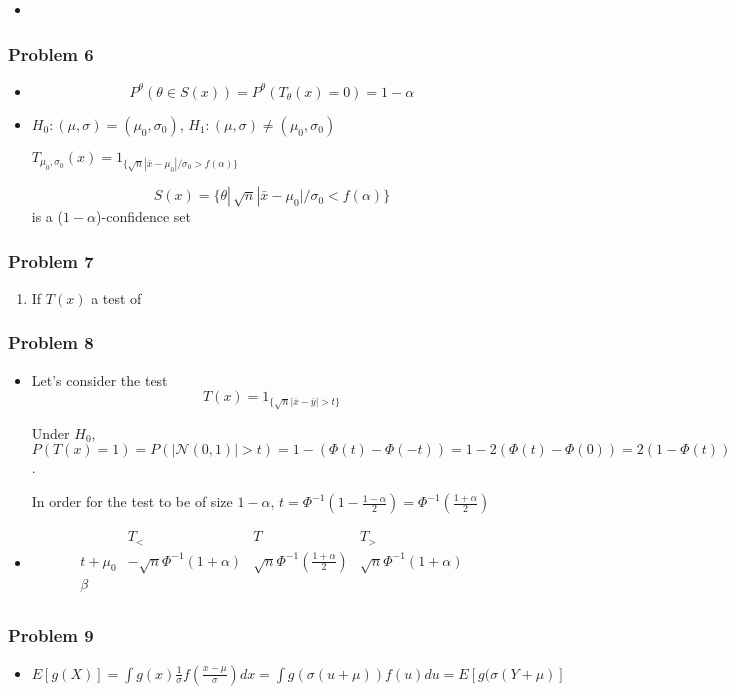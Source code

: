 \documentclass[12pt]{article}
\newcommand{\Q}[1]{\subsubsection*{Problem #1}}
\begin{document}
\begin{itemize}
\begin{itemize}
\item 

\end{itemize}


\Q{6}
\begin{itemize}
\item $$P^{\theta}(\theta \in S(x)) = P^{\theta}(T_{\theta}(x) = 0) = 1 - \alpha$$

\item 

$H_0: (\mu, \sigma) = (\mu_0, \sigma_0)$,
$H_1: (\mu, \sigma) \ne (\mu_0, \sigma_0)$

$T_{\mu_0, \sigma_0}(x) = 1_{\{\sqrt n |\bar x - \mu_0| / \sigma_0 > f(\alpha) \} }$

$$S(x) = \{ \theta |\, \sqrt n |\bar x - \mu_0| / \sigma_0 < f(\alpha) \}
$$ is a ($1-\alpha$)-confidence set

\end{itemize}


\Q{7}
\begin{enumerate}
\item If $T(x)$ a test of 


\end{enumerate}


\Q{8}
\begin{itemize}
\item Let's consider the test $$T(x) = 1_{\{\sqrt n|\bar x - \bar y| > t\} }$$

Under $H_0$, $P(T(x) = 1) = P(|\mathcal N(0, 1)| > t) = 1 - (\Phi(t) - \Phi(-t)) = 1 - 2(\Phi(t) - \Phi(0)) = 2(1 - \Phi(t))$.

In order for the test to be of size $1-\alpha$, $t = \Phi^{-1}(1 - \frac{1-\alpha}2) = \Phi^{-1}(\frac{1+\alpha}2)$


\item 
\[
\begin{array}{c|c|c|c}
& T_< & T & T_> \\
\hline
t+\mu_0 & -\sqrt n \Phi^{-1}(1 + \alpha) & \sqrt n\Phi^{-1}(\frac{1+\alpha}2) & \sqrt n\Phi^{-1}(1 + \alpha) \\
\beta &  &  &  \\
\end{array}
\]
\end{itemize}

\Q{9}

\begin{itemize}
\item $E[g(X)] = \int g(x) \frac 1 {\sigma} f(\frac{x - \mu}{\sigma}) dx = \int g(\sigma(u+\mu))  f(u) du = E[g(\sigma(Y + \mu)]$


\end{itemize}
\end{itemize}
\end{document}
